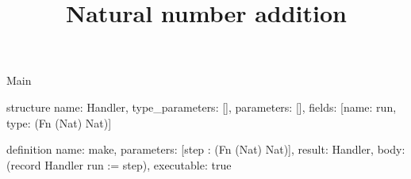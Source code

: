 \begin{lexlean}{Main}
\title{Natural number addition}
\begin{semanticmodule}
structure{
  name: Handler,
  type_parameters: [],
  parameters: [],
  fields: [{name: run, type: (Fn (Nat) Nat)}]
}

definition{
  name: make,
  parameters: [step : (Fn (Nat) Nat)],
  result: Handler,
  body: (record Handler {run := step}),
  executable: true
}
\end{semanticmodule}
\end{lexlean}
